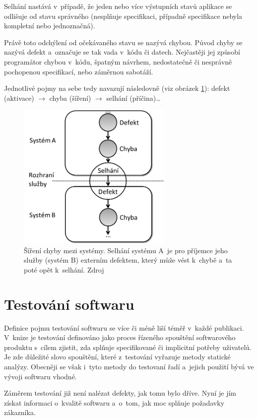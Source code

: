 	Selhání nastává v~případě, že jeden nebo více výstupních stavů aplikace se odlišuje od stavu správného (nesplňuje specifikaci, případně specifikace nebyla kompletní nebo jednoznačná).
	
	Právě toto odchýlení od očekávaného stavu se nazývá chybou. Původ chyby se nazývá defekt a~označuje se tak vada v~kódu či datech. Nejčastěji jej způsobí programátor chybou v~kódu, špatným návrhem, nedostatečně či nesprávně pochopenou specifikací, nebo záměrnou sabotáží.
	
	Jednotlivé pojmy na sebe tedy navazují následovně (viz obrázek \ref{Bug}): defekt (aktivace) $\to$ chyba (šíření) $\to$ selhání (příčina)\dots
	\begin{figure}[ht!]
		\centering
		\caption{Šíření chyby mezi systémy. Selhání systému A~je pro příjemce jeho služby (systém B) externím defektem, který může vést k~chybě a~ta poté opět  k~selhání. Zdroj \citep{RizeniKvalitySW}}
		\label{Bug}
		\includegraphics[width=7.5cm]{img/Bug.png}
	\end{figure}
	
	\section{Testování softwaru}
	Definice pojmu testování softwaru se více či méně liší téměř v~každé publikaci. V~knize \citep{RizeniKvalitySW} je testování definováno jako proces řízeného spouštění softwarového produktu s~cílem zjistit, zda splňuje specifikované či implicitní potřeby uživatelů. Je zde důležité slovo spouštění, které z~testování vyřazuje metody statické analýzy. Obecněji se však i~tyto metody do testovaní řadí a~jejich použití bývá ve vývoji softwaru vhodné.
	
	Záměrem testování již není nalézat defekty, jak tomu bylo dříve. Nyní je jím získat informaci o~kvalitě softwaru a~o~tom, jak moc splňuje požadavky zákazníka.
	
